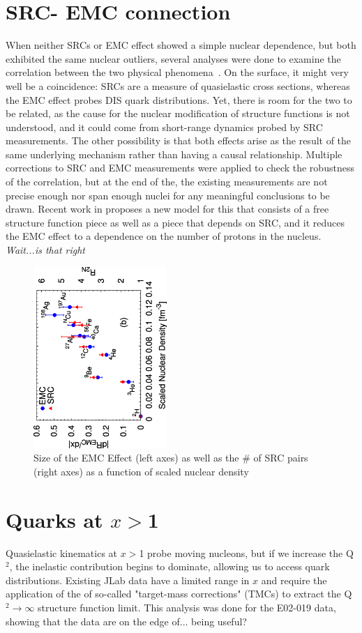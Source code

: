 \section{\label{sec:SRC_EMC}SRC- EMC connection}
When neither SRCs or EMC effect showed a simple nuclear dependence, but both exhibited the same nuclear outliers, several analyses were done to examine the correlation between the two physical phenomena~\cite{arrington12, Hen:2012fm, Weinstein:2010rt}.  On the surface, it might very well be a coincidence: SRCs are a measure of quasielastic cross sections, whereas the EMC effect probes DIS quark distributions.  Yet, there is room for the two to be related, as the cause for the nuclear modification of structure functions is not understood, and it could come from short-range dynamics probed by SRC measurements.   The other possibility is that both effects arise as the result of the same underlying mechanism rather than having a causal relationship.  Multiple corrections to SRC and EMC measurements were applied to check the robustness of the correlation, but at the end of the, the existing measurements are not precise enough nor span enough nuclei for any meaningful conclusions to be drawn.  Recent work in %
proposes a new model for this that consists of a free structure function piece as well as a piece that depends on SRC, and it  reduces the EMC effect to a dependence on the number of protons in the nucleus.  \textit{Wait...is that right}
\begin{figure}[htb]
  \includegraphics[angle=270, width=0.45\textwidth]{plots/emc_src_vs_scaled_dens_all.eps}
  \caption{Size of the EMC Effect (left axes) as well as the \# of SRC pairs (right axes) as a function of scaled nuclear density}
  \label{fig:src_emc}
\end{figure}
\section{Quarks at $x>$1}
Quasielastic kinematics at $x>$1 probe moving nucleons, but if we increase the Q$^2$, the inelastic contribution begins to dominate, allowing us to access quark distributions. Existing JLab data have a limited range in $x$ and require the application of the of so-called "target-mass corrections" (TMCs) to extract the Q$^2\rightarrow\infty$ structure function limit.  This analysis was done for the E02-019 data, showing that the data are on the edge of... being useful?


